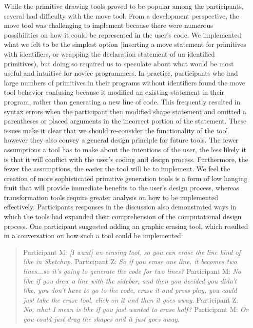 \documentclass{sigchi}
\begin{document}
While the primitive drawing tools proved to be popular among the participants, several had difficulty with the move tool. From a development perspective, the move tool was challenging to implement because there were numerous possibilities on how it could be represented in the user's code. We implemented what we felt to be the simplest option (inserting a move statement for primitives with identifiers, or wrapping the declaration statement of un-identified primitives), but doing so required us to speculate about what would be most useful and intuitive for novice programmers. In practice, participants who had large numbers of primitives in their programs without identifiers found the move tool behavior confusing because it modified an existing statement in their program, rather than generating a new line of code. This frequently resulted in syntax errors when the participant then modified shape statement and omitted a parentheses or placed arguments in the incorrect portion of the statement. These issues make it clear that we should re-consider the functionality of the tool, however they also convey a general design principle for future tools. The fewer assumptions a tool has to make about the intentions of the user, the less likely it is that it will conflict with the user's coding and design process. Furthermore, the fewer the assumptions, the easier the tool will be to implement. We feel the creation of more sophisticated primitive generation tools is a form of low hanging fruit that will provide immediate benefits to the user's design process, whereas transformation tools require greater analysis on how to be implemented effectively. Participants responses in the discussion also demonstrated ways in which the tools had expanded their comprehension of the computational design process. One participant suggested adding an graphic erasing tool, which resulted in a conversation on how such a tool could be implemented:

\begin{quotation}
Participant M: \textit{[I want] an erasing tool, so you can erase the line kind of like in Sketchup.}  
Participant Z: \textit{So if you erase one line, it becomes two lines...so it's going to generate the code for two lines?}
Participant M: \textit{No like if you drew a line with the sidebar, and then you decided you didn't like, you don't have to go to the code, erase it and press play, you could just take the erase tool, click on it and then it goes away.}
Participant Z:  \textit{No, what I mean is like if you just wanted to erase half?}
Participant M: \textit{Or you could just drag the shapes and it just goes away.}
\end{quotation}
\end{document}
